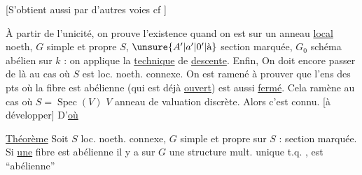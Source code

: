 [S'obtient aussi par d'autres voies  cf \unsure{\textemdash}]

À partir de l'unicité, on prouve l'existence quand on est sur un anneau \uline{local} noeth, $G$ simple et propre $S$, $\unsure{A'|a'|0'|\text{à}}$ section marquée, $G_0$ schéma abélien sur $k$ : on applique la \uline{technique} de \uline{descente}. Enfin, On doit encore passer de là au cas où $S$ est loc. noeth. connexe. On est ramené à prouver que l'ens des pts où la fibre est abélienne (qui est déjà \uline{ouvert}) est aussi \uline{fermé}. Cela ramène au cas où $S=\operatorname{Spec}(V)$ $V$ anneau de valuation discrète. Alors c'est connu.  [à développer] D'\uline{où}

\uline{Théorème} Soit $S$ loc. noeth. connexe, $G$ simple et propre sur $S$ : section marquée. Si \uline{une} fibre est abélienne il y a sur $G$ une structure mult. unique t.q.  ,  est ``abélienne''
